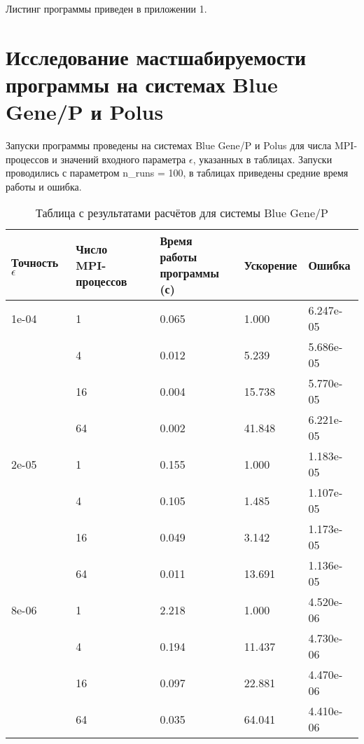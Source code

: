 \documentclass[oneside, final, 12pt]{extarticle}
\begin{document}
Листинг программы приведен в приложении 1.

\section{Исследование мастшабируемости программы на системах Blue Gene/P \cite{BlueGene} и
  Polus \cite{Polus}}

Запуски программы проведены на системах Blue Gene/P и Polus для числа MPI-процессов и значений входного параметра $ \epsilon $, указанных в таблицах.
Запуски проводились с параметром n\_runs = 100, в таблицах приведены средние время работы и ошибка.  

\begin{table}[H]
    \centering
    \begin{tabular}{|l|l|l|l|l|}
        \hline
        Точность $ \epsilon $ & \makecell{Число                              \\MPI-процессов} & \makecell{Время работы \\ программы (с)} & Ускорение & Ошибка \\
        \hline
        1e-04                 & 1               & 0.065 & 1.000  & 6.247e-05 \\
        \cline{2-5}
                              & 4               & 0.012 & 5.239  & 5.686e-05 \\
        \cline{2-5}
                              & 16              & 0.004 & 15.738 & 5.770e-05 \\
        \cline{2-5}
                              & 64              & 0.002 & 41.848 & 6.221e-05 \\
        \hline
        2e-05                 & 1               & 0.155 & 1.000  & 1.183e-05 \\
        \cline{2-5}
                              & 4               & 0.105 & 1.485  & 1.107e-05 \\
        \cline{2-5}
                              & 16              & 0.049 & 3.142  & 1.173e-05 \\
        \cline{2-5}
                              & 64              & 0.011 & 13.691 & 1.136e-05 \\
        \hline
        8e-06                 & 1               & 2.218 & 1.000  & 4.520e-06 \\
        \cline{2-5}
                              & 4               & 0.194 & 11.437 & 4.730e-06 \\
        \cline{2-5}
                              & 16              & 0.097 & 22.881 & 4.470e-06 \\
        \cline{2-5}
                              & 64              & 0.035 & 64.041 & 4.410e-06 \\
        \hline
    \end{tabular}
    \caption{Таблица с результатами расчётов для системы Blue Gene/P}
\end{table}
\end{document}
